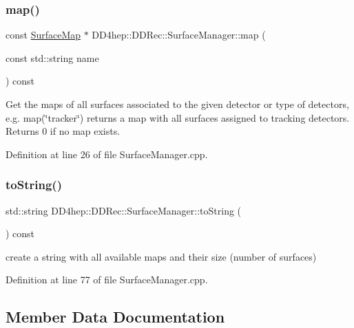 \subsubsection{\texorpdfstring{map()}{map()}}
{\footnotesize\ttfamily const \hyperlink{namespace_d_d4hep_1_1_d_d_rec_a04db40c967eb23286f472ac1c17931d1}{Surface\+Map} $\ast$ D\+D4hep\+::\+D\+D\+Rec\+::\+Surface\+Manager\+::map (\begin{DoxyParamCaption}\item[{const std\+::string}]{name }\end{DoxyParamCaption}) const}

Get the maps of all surfaces associated to the given detector or type of detectors, e.\+g. map(\char`\"{}tracker\char`\"{}) returns a map with all surfaces assigned to tracking detectors. Returns 0 if no map exists. 

Definition at line 26 of file Surface\+Manager.\+cpp.

\hypertarget{class_d_d4hep_1_1_d_d_rec_1_1_surface_manager_ad631f3c718f85235cd42915cf2b66178}{}\label{class_d_d4hep_1_1_d_d_rec_1_1_surface_manager_ad631f3c718f85235cd42915cf2b66178} 
\subsubsection{\texorpdfstring{to\+String()}{toString()}}
{\footnotesize\ttfamily std\+::string D\+D4hep\+::\+D\+D\+Rec\+::\+Surface\+Manager\+::to\+String (\begin{DoxyParamCaption}{ }\end{DoxyParamCaption}) const}



create a string with all available maps and their size (number of surfaces) 



Definition at line 77 of file Surface\+Manager.\+cpp.



\subsection{Member Data Documentation}
\hypertarget{class_d_d4hep_1_1_d_d_rec_1_1_surface_manager_a372c8c43ba149a5bf7d14da8ef63223d}{}\label{class_d_d4hep_1_1_d_d_rec_1_1_surface_manager_a372c8c43ba149a5bf7d14da8ef63223d} 
